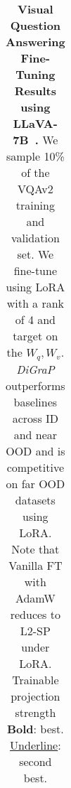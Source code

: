 \begin{table}[!h]
{\begin{tabular}{@{}c|cccccccc|cccc|c@{}}
        \bottomrule
        \end{tabular}}
          \caption{\textbf{Visual Question Answering Fine-Tuning Results using LLaVA-7B~\citep{liu2023visualinstructiontuning}.} We sample 10\% of the VQAv2 training and validation set. We fine-tune using LoRA with a rank of 4 and target on the $W_q, W_v$. \emph{DiGraP} outperforms baselines across ID and near OOD and is competitive on far OOD datasets using LoRA. Note that Vanilla FT with AdamW reduces to L2-SP under LoRA. Trainable projection strength \textbf{Bold}: best. \underline{Underline}: second best.}
          \label{tab:vqa_llava}
      \end{table}